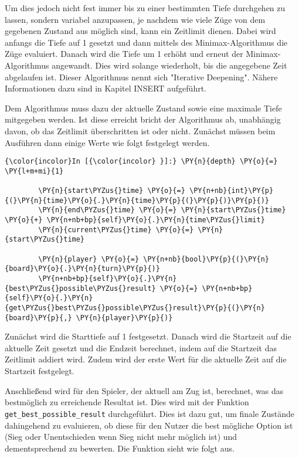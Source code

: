 Um dies jedoch nicht fest immer bis zu einer bestimmten Tiefe durchgehen
zu lassen, sondern variabel anzupassen, je nachdem wie viele Züge von
dem gegebenen Zustand aus möglich sind, kann ein Zeitlimit dienen. Dabei
wird anfangs die Tiefe auf 1 gesetzt und dann mittels des
Minimax-Algorithmus die Züge evaluiert. Danach wird die Tiefe um 1
erhöht und erneut der Minimax-Algorithmus angewandt. Dies wird solange
wiederholt, bis die angegebene Zeit abgelaufen ist. Dieser Algorithmus
nennt sich "Iterative Deepening". Nähere Informationen dazu sind in
Kapitel INSERT aufgeführt.

Dem Algorithmus muss dazu der aktuelle Zustand sowie eine maximale Tiefe
mitgegeben werden. Ist diese erreicht bricht der Algorithmus ab,
unabhängig davon, ob das Zeitlimit überschritten ist oder nicht.
Zunächst müssen beim Ausführen dann einige Werte wie folgt festgelegt
werden.

    \begin{Verbatim}[commandchars=\\\{\}]
{\color{incolor}In [{\color{incolor} }]:} \PY{n}{depth} \PY{o}{=} \PY{l+m+mi}{1}
            
        \PY{n}{start\PYZus{}time} \PY{o}{=} \PY{n+nb}{int}\PY{p}{(}\PY{n}{time}\PY{o}{.}\PY{n}{time}\PY{p}{(}\PY{p}{)}\PY{p}{)}
        \PY{n}{end\PYZus{}time} \PY{o}{=} \PY{n}{start\PYZus{}time} \PY{o}{+} \PY{n+nb+bp}{self}\PY{o}{.}\PY{n}{time\PYZus{}limit}
        \PY{n}{current\PYZus{}time} \PY{o}{=} \PY{n}{start\PYZus{}time}
        
        \PY{n}{player} \PY{o}{=} \PY{n+nb}{bool}\PY{p}{(}\PY{n}{board}\PY{o}{.}\PY{n}{turn}\PY{p}{)}
        \PY{n+nb+bp}{self}\PY{o}{.}\PY{n}{best\PYZus{}possible\PYZus{}result} \PY{o}{=} \PY{n+nb+bp}{self}\PY{o}{.}\PY{n}{get\PYZus{}best\PYZus{}possible\PYZus{}result}\PY{p}{(}\PY{n}{board}\PY{p}{,} \PY{n}{player}\PY{p}{)}
\end{Verbatim}

    Zunächst wird die Starttiefe auf 1 festgesetzt. Danach wird die
Startzeit auf die aktuelle Zeit gesetzt und die Endzeit berechnet, indem
auf die Startzeit das Zeitlimit addiert wird. Zudem wird der erste Wert
für die aktuelle Zeit auf die Startzeit festgelegt.

Anschließend wird für den Spieler, der aktuell am Zug ist, berechnet,
was das bestmöglich zu erreichende Resultat ist. Dies wird mit der
Funktion \texttt{get\_best\_possible\_result} durchgeführt. Dies ist
dazu gut, um finale Zustände dahingehend zu evaluieren, ob diese für den
Nutzer die best mögliche Option ist (Sieg oder Unentschieden wenn Sieg
nicht mehr möglich ist) und dementsprechend zu bewerten. Die Funktion
sieht wie folgt aus.

